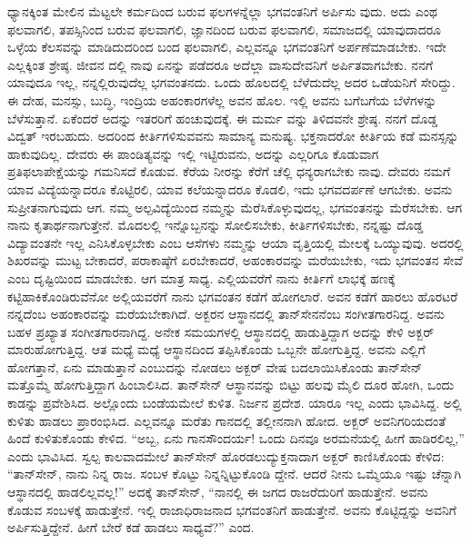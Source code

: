 ಧ್ಯಾನಕ್ಕಿಂತ ಮೇಲಿನ ಮೆಟ್ಟಲೇ ಕರ್ಮದಿಂದ ಬರುವ ಫಲಗಳನ್ನೆಲ್ಲಾ ಭಗವಂತನಿಗೆ ಅರ್ಪಿಸು ವುದು. ಅದು ಎಂಥ ಫಲವಾಗಲಿ, ತಪಸ್ಸಿನಿಂದ ಬರುವ ಫಲವಾಗಲಿ, ಜ್ಞಾನದಿಂದ ಬರುವ ಫಲವಾಗಲಿ, ಸಮಾಜದಲ್ಲಿ ಯಾವುದಾದರೂ ಒಳ್ಳೆಯ ಕೆಲಸವನ್ನು ಮಾಡಿದುದರಿಂದ ಬಂದ ಫಲವಾಗಲಿ, ಎಲ್ಲವನ್ನೂ ಭಗವಂತನಿಗೆ ಅರ್ಪಣೆಮಾಡಬೇಕು. ಇದೇ ಎಲ್ಲಕ್ಕಿಂತ ಶ್ರೇಷ್ಠ. ಜೀವನ ದಲ್ಲಿ ನಾವು ಏನನ್ನು ಪಡೆದರೂ ಅದೆಲ್ಲಾ ವಾಸುದೇವನಿಗೆ ಅರ್ಪಿತವಾಗಬೇಕು. ನನಗೆ ಯಾವುದೂ ಇಲ್ಲ, ನನ್ನಲ್ಲಿರುವುದೆಲ್ಲ ಭಗವಂತನದು. ಒಂದು ಹೊಲದಲ್ಲಿ ಬೆಳೆದುದೆಲ್ಲ ಅದರ ಒಡೆಯನಿಗೆ ಸೇರಿದ್ದು. ಈ ದೇಹ, ಮನಸ್ಸು, ಬುದ್ಧಿ, ಇಂದ್ರಿಯ ಅಹಂಕಾರಗಳೆಲ್ಲ ಅವನ ಹೊಲ. ಇಲ್ಲಿ ಅವನು ಬಗೆಬಗೆಯ ಬೆಳೆಗಳನ್ನು ಬೆಳೆಸುತ್ತಾನೆ. ಏಕೆಂದರೆ ಅದನ್ನು ಇತರರಿಗೆ ಹಂಚುವುದಕ್ಕೆ. ಈ ಮರ್ಮ ವನ್ನು ತಿಳಿದವನೇ ಶ್ರೇಷ್ಠ. ನನಗೆ ದೊಡ್ಡ ವಿದ್ವತ್ ಇರಬಹುದು. ಅದರಿಂದ ಕೀರ್ತಿಗಳಿಸುವವನು ಸಾಮಾನ್ಯ ಮನುಷ್ಯ. ಭಕ್ತನಾದರೋ ಕೀರ್ತಿಯ ಕಡೆ ಮನಸ್ಸನ್ನು ಹಾಕುವುದಿಲ್ಲ. ದೇವರು ಈ ಪಾಂಡಿತ್ಯವನ್ನು ಇಲ್ಲಿ ಇಟ್ಟಿರುವನು, ಅದನ್ನು ಎಲ್ಲರಿಗೂ ಕೊಡುವಾಗ ಪ್ರತಿಫಲಾಪೇಕ್ಷೆಯನ್ನು ಗಮನಿಸದೆ ಕೊಡುವ. ಕೆರೆಯ ನೀರನ್ನು ಕೆರೆಗೆ ಚೆಲ್ಲಿ ಧನ್ಯರಾಗಬೇಕು ನಾವು. ದೇವರು ನಮಗೆ ಯಾವ ವಿದ್ಯೆಯನ್ನಾದರೂ ಕೊಟ್ಟಿರಲಿ, ಯಾವ ಕಲೆಯನ್ನಾದರೂ ಕೊಡಲಿ, ಇದು ಭಗವದರ್ಪಣೆ ಆಗಬೇಕು. ಅವನು ಸುಪ್ರೀತನಾಗುವುದು ಆಗ. ನಮ್ಮ ಅಲ್ಪವಿದ್ಯೆಯಿಂದ ನಮ್ಮನ್ನು ಮೆರೆಸಿಕೊಳ್ಳುವುದಲ್ಲ, ಭಗವಂತನನ್ನು ಮೆರೆಸಬೇಕು. ಆಗ ನಾನು ಕೃತಾರ್ಥನಾಗುತ್ತೇನೆ. ಮೊದಲಲ್ಲಿ ಇನ್ನೊಬ್ಬನನ್ನು ಸೋಲಿಸಬೇಕು, ಕೀರ್ತಿಗಳಿಸಬೇಕು, ನನ್ನಷ್ಟು ದೊಡ್ಡ ವಿದ್ಯಾವಂತನೇ ಇಲ್ಲ ಎನಿಸಿಕೊಳ್ಳಬೇಕು ಎಂಬ ಆಸೆಗಳು ನಮ್ಮನ್ನು ಆಯಾ ವೃತ್ತಿಯಲ್ಲಿ ಮೇಲಕ್ಕೆ ಒಯ್ಯುವುವು. ಅದರಲ್ಲಿ ಶಿಖರವನ್ನು ಮುಟ್ಟ ಬೇಕಾದರೆ, ಪರಾಕಾಷ್ಠೆಗೆ ಏರಬೇಕಾದರೆ, ಅಹಂಕಾರವನ್ನು ಮರೆಯಬೇಕು, ಇದು ಭಗವಂತನ ಸೇವೆ ಎಂಬ ದೃಷ್ಟಿಯಿಂದ ಮಾಡಬೇಕು. ಆಗ ಮಾತ್ರ ಸಾಧ್ಯ. ಎಲ್ಲಿಯವರೆಗೆ ನಾನು ಕೀರ್ತಿಗೆ ಲಾಭಕ್ಕೆ ಹಣಕ್ಕೆ ಕಟ್ಟಿಹಾಕಿಕೊಂಡಿರುವೆನೋ ಅಲ್ಲಿಯವರೆಗೆ ನಾನು ಭಗವಂತನ ಕಡೆಗೆ ಹೋಗಲಾರೆ. ಅವನ ಕಡೆಗೆ ಹಾರಲು ಹೊರಟರೆ ನನ್ನದೆಂಬ ಅಹಂಕಾರವನ್ನು ಮರೆಯಬೇಕಾಗಿದೆ. ಅಕ್ಬರನ ಆಸ್ಥಾನದಲ್ಲಿ ತಾನ್​ಸೇನನೆಂಬ ಸಂಗೀತಗಾರನಿದ್ದ. ಅವನು ಬಹಳ ಪ್ರಖ್ಯಾತ ಸಂಗೀತಗಾರನಾಗಿದ್ದ. ಅನೇಕ ಸಮಯಗಳಲ್ಲಿ ಆಸ್ಥಾನದಲ್ಲಿ ಹಾಡುತ್ತಿದ್ದಾಗ ಅದನ್ನು ಕೇಳಿ ಅಕ್ಬರ್ ಮಾರುಹೋಗುತ್ತಿದ್ದ. ಆತ ಮಧ್ಯೆ ಮಧ್ಯೆ ಆಸ್ಥಾನದಿಂದ ತಪ್ಪಿಸಿಕೊಂಡು ಒಬ್ಬನೇ ಹೋಗುತ್ತಿದ್ದ. ಅವನು ಎಲ್ಲಿಗೆ ಹೋಗತ್ತಾನೆ, ಏನು ಮಾಡುತ್ತಾನೆ ಎಂಬುದನ್ನು ನೋಡಲು ಅಕ್ಬರ್ ವೇಷ ಬದಲಾಯಿಸಿಕೊಂಡು ತಾನ್​ಸೇನ್ ಮತ್ತೊಮ್ಮೆ ಹೋಗುತ್ತಿದ್ದಾಗ ಹಿಂಬಾಲಿಸಿದ. ತಾನ್​ಸೇನ್ ಆಸ್ಥಾನವನ್ನು ಬಿಟ್ಟು ಹಲವು ಮೈಲಿ ದೂರ ಹೋಗಿ, ಒಂದು ಕಾಡನ್ನು ಪ್ರವೇಶಿಸಿದ. ಅಲ್ಲೊಂದು ಬಂಡೆಯಮೇಲೆ ಕುಳಿತ. ನಿರ್ಜನ ಪ್ರದೇಶ. ಯಾರೂ ಇಲ್ಲ ಎಂದು ಭಾವಿಸಿದ್ದ. ಅಲ್ಲಿ ಕುಳಿತು ಹಾಡಲು ಪ್ರಾರಂಭಿಸಿದ. ಎಲ್ಲವನ್ನೂ ಮರೆತು ಗಾನದಲ್ಲಿ ತಲ್ಲೀನನಾಗಿ ಹೋದ. ಅಕ್ಬರ್ ಅವನಿಗರಿಯದಂತೆ ಹಿಂದೆ ಕುಳಿತುಕೊಂಡು ಕೇಳಿದ. “ಅಬ್ಬ, ಏನು ಗಾನಸೌಂದರ್ಯ! ಒಂದು ದಿನವೂ ಅರಮನೆಯಲ್ಲಿ ಹೀಗೆ ಹಾಡಿರಲಿಲ್ಲ,” ಎಂದು ಭಾವಿಸಿದ. ಸ್ವಲ್ಪ ಕಾಲವಾದಮೇಲೆ ತಾನ್​ಸೇನ್ ಹೊರಡಲುದ್ಯುಕ್ತನಾದಾಗ ಅಕ್ಬರ್ ಕಾಣಿಸಿಕೊಂಡು ಕೇಳಿದ: “ತಾನ್​ಸೇನ್, ನಾನು ನಿನ್ನ ರಾಜ. ಸಂಬಳ ಕೊಟ್ಟು ನಿನ್ನನ್ನಿಟ್ಟುಕೊಂಡಿ ದ್ದೇನೆ. ಆದರೆ ನೀನು ಒಮ್ಮೆಯೂ ಇಷ್ಟು ಚೆನ್ನಾಗಿ ಆಸ್ಥಾನದಲ್ಲಿ ಹಾಡಲಿಲ್ಲವಲ್ಲ!” ಅದಕ್ಕೆ ತಾನ್​ಸೇನ್, “ನಾನಲ್ಲಿ ಈ ಜಗದ ರಾಜರೆದುರಿಗೆ ಹಾಡುತ್ತೇನೆ. ಅವನು ಕೊಡುವ ಸಂಬಳಕ್ಕೆ ಹಾಡುತ್ತೇನೆ. ಇಲ್ಲಿ ರಾಜಾಧಿರಾಜನಾದ ಭಗವಂತನಿಗೆ ಹಾಡುತ್ತೇನೆ. ಅವನು ಕೊಟ್ಟಿದ್ದನ್ನು ಅವನಿಗೆ ಅರ್ಪಿಸುತ್ತಿದ್ದೇನೆ. ಹೀಗೆ ಬೇರೆ ಕಡೆ ಹಾಡಲು ಸಾಧ್ಯವೆ?” ಎಂದ.

